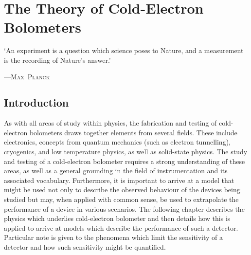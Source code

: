 \chapter{The Theory of  Cold-Electron Bolometers}
\label{cha:theory}
\epigraph{`An experiment is a question which science poses to Nature, and a measurement is the recording of Nature's answer.'}{\mbox{\textup{---\textsc{Max Planck}}}}
%
\section{Introduction}\label{sec:theory-introduction}
As with all areas of study within physics, the fabrication and testing of cold-electron bolometers draws together elements from several fields. These include electronics, concepts from quantum mechanics (such as electron tunnelling), cryogenics, and low temperature physics, as well as solid-state physics. The study and testing of a cold-electron bolometer requires a strong understanding of these areas, as well as a general grounding in the field of instrumentation and its associated vocabulary. Furthermore, it is important to arrive at a model that might be used not only to describe the observed behaviour of the devices being studied but may, when applied with common sense, be used to extrapolate the performance of a device in various scenarios. The following chapter describes the physics which underlies cold-electron bolometer and then details how this is applied to arrive at models which describe the performance of such a detector. Particular note is given to the phenomena which limit the sensitivity of a detector and how such sensitivity might be quantified.
%
